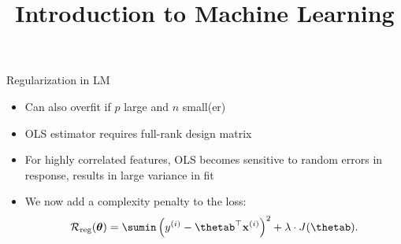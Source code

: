 \documentclass[11pt,compress,t,notes=noshow, xcolor=table]{beamer}
\title{Introduction to Machine Learning}
\begin{document}



\begin{vbframe}{Regularization in LM}

  \begin{itemize} \setlength{\itemsep}{1.3em}
  \item Can also overfit if $p$ large and $n$ small(er)
  \item OLS estimator requires full-rank design matrix
  \item For highly correlated features, OLS becomes sensitive to random errors in response, results in large variance in fit
  \item We now add a complexity penalty to the loss:
  $$
  \riskrt = \sumin \left(\yi - \thetab^\top \xi \right)^2 + \lambda \cdot J(\thetab). 
  $$ 
  \end{itemize}

\end{vbframe}






\end{document}
